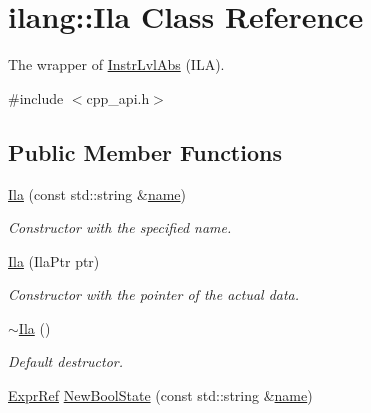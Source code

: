 \hypertarget{classilang_1_1_ila}{}\section{ilang\+:\+:Ila Class Reference}
\label{classilang_1_1_ila}


The wrapper of \mbox{\hyperlink{classilang_1_1_instr_lvl_abs}{Instr\+Lvl\+Abs}} (I\+LA).  




{\ttfamily \#include $<$cpp\+\_\+api.\+h$>$}

\subsection*{Public Member Functions}
\begin{DoxyCompactItemize}
\item 
\mbox{\label{classilang_1_1_ila_a04b8de613b8afad49d3c6758755aae4d}} 
\mbox{\hyperlink{classilang_1_1_ila_a04b8de613b8afad49d3c6758755aae4d}{Ila}} (const std\+::string \&\mbox{\hyperlink{classilang_1_1_ila_aef59c0b294a99f65ce5dccef8dd1ccb7}{name}})
\begin{DoxyCompactList}\small\item\em Constructor with the specified name. \end{DoxyCompactList}\item 
\mbox{\label{classilang_1_1_ila_a2b661ff9568608f43af0b3c556003472}} 
\mbox{\hyperlink{classilang_1_1_ila_a2b661ff9568608f43af0b3c556003472}{Ila}} (Ila\+Ptr ptr)
\begin{DoxyCompactList}\small\item\em Constructor with the pointer of the actual data. \end{DoxyCompactList}\item 
\mbox{\label{classilang_1_1_ila_ae128e007280d3d334834af931ef60217}} 
\mbox{\hyperlink{classilang_1_1_ila_ae128e007280d3d334834af931ef60217}{$\sim$\+Ila}} ()
\begin{DoxyCompactList}\small\item\em Default destructor. \end{DoxyCompactList}\item 
\mbox{\hyperlink{classilang_1_1_expr_ref}{Expr\+Ref}} \mbox{\hyperlink{classilang_1_1_ila_aa08f99af425455d098aaae6c139476b0}{New\+Bool\+State}} (const std\+::string \&\mbox{\hyperlink{classilang_1_1_ila_aef59c0b294a99f65ce5dccef8dd1ccb7}{name}})

\end{DoxyCompactItemize}
